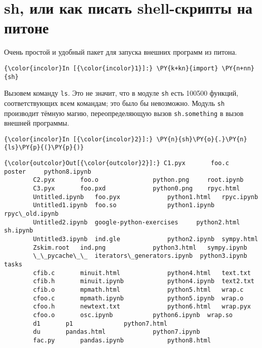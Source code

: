 \section{sh, или как писать shell-скрипты на питоне}
\label{S26a}

Очень простой и удобный пакет для запуска внешних программ из питона.

    \begin{Verbatim}[commandchars=\\\{\}]
{\color{incolor}In [{\color{incolor}1}]:} \PY{k+kn}{import} \PY{n+nn}{sh}
\end{Verbatim}


    Вызовем команду \texttt{ls}. Это не значит, что в модуле \texttt{sh}
есть 100500 функций, соответствующих всем командам; это было бы
невозможно. Модуль \texttt{sh} производит тёмную магию, переопределяющую
вызов \texttt{sh.something} в вызов внешней программы.

    \begin{Verbatim}[commandchars=\\\{\}]
{\color{incolor}In [{\color{incolor}2}]:} \PY{n}{sh}\PY{o}{.}\PY{n}{ls}\PY{p}{(}\PY{p}{)}
\end{Verbatim}


\begin{Verbatim}[commandchars=\\\{\}]
{\color{outcolor}Out[{\color{outcolor}2}]:} C1.pyx		 foo.c			     poster	    python8.ipynb
        C2.pyx		 foo.o			     python.png     root.ipynb
        C3.pyx		 foo.pxd		     python0.png    rpyc.html
        Untitled.ipynb	 foo.pyx		     python1.html   rpyc.ipynb
        Untitled1.ipynb  foo.so			     python1.ipynb  rpyc\_old.ipynb
        Untitled2.ipynb  google-python-exercises     python2.html   sh.ipynb
        Untitled3.ipynb  ind.gle		     python2.ipynb  sympy.html
        Zskim.root	 ind.png		     python3.html   sympy.ipynb
        \_\_pycache\_\_	 iterators\_generators.ipynb  python3.ipynb  tasks
        cfib.c		 minuit.html		     python4.html   text.txt
        cfib.h		 minuit.ipynb		     python4.ipynb  text2.txt
        cfib.o		 mpmath.html		     python5.html   wrap.c
        cfoo.c		 mpmath.ipynb		     python5.ipynb  wrap.o
        cfoo.h		 newtext.txt		     python6.html   wrap.pyx
        cfoo.o		 osc.ipynb		     python6.ipynb  wrap.so
        d1		 p1			     python7.html
        du		 pandas.html		     python7.ipynb
        fac.py		 pandas.ipynb		     python8.html
\end{Verbatim}
            
